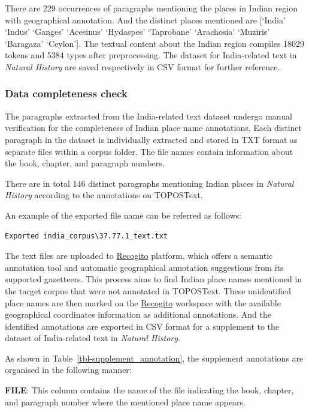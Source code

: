 \documentclass[
  12pt,
]{article}
\begin{document}
There are 229 occurrences of paragraphs mentioning the places in Indian
region with geographical annotation. And the distinct places mentioned
are {[}`India' `Indus' `Ganges' `Acesinus' `Hydaspes' `Taprobane'
`Arachosia' `Muziris' `Baragaza' `Ceylon'{]}. The textual content about
the Indian region compiles 18029 tokens and 5384 types after
preprocessing. The dataset for India-related text in \emph{Natural
History} are saved respectively in CSV format for further reference.

\hypertarget{data-completeness-check}{%
\subsubsection{Data completeness check}\label{data-completeness-check}}

The paragraphs extracted from the India-related text dataset undergo
manual verification for the completeness of Indian place name
annotations. Each distinct paragraph in the dataset is individually
extracted and stored in TXT format as separate files within a corpus
folder. The file names contain information about the book, chapter, and
paragraph numbers.

There are in total 146 distinct paragraphs mentioning Indian places in
\emph{Natural History} according to the annotations on TOPOSText.

An example of the exported file name can be referred as follows:

\begin{verbatim}
Exported india_corpus\37.77.1_text.txt
\end{verbatim}

The text files are uploaded to
\href{https://recogito.pelagios.org/}{Recogito} platform, which offers a
semantic annotation tool and automatic geographical annotation
suggestions from its supported gazetteers. This process aims to find
Indian place names mentioned in the target corpus that were not
annotated in TOPOSText. These unidentified place names are then marked
on the \href{https://recogito.pelagios.org/}{Recogito} workspace with
the available geographical coordinates information as additional
annotations. And the identified annotations are exported in CSV format
for a supplement to the dataset of India-related text in \emph{Natural
History}.

As shown in Table~\ref{tbl-supplement_annotation}, the supplement
annotations are organised in the following manner:

\textbf{FILE}: This column contains the name of the file indicating the
book, chapter, and paragraph number where the mentioned place name
appears.
\end{document}
